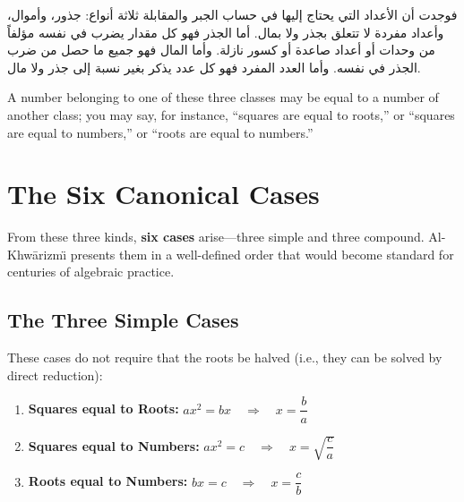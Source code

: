 \documentclass[11pt,a4paper]{book}
\begin{document}
\begin{arabicbox}
\begin{Arabic}
فوجدت أن الأعداد التي يحتاج إليها في حساب الجبر والمقابلة
ثلاثة أنواع: جذور، وأموال، وأعداد مفردة لا تتعلق بجذر ولا
بمال. أما الجذر فهو كل مقدار يضرب في نفسه مؤلفاً من
وحدات أو أعداد صاعدة أو كسور نازلة. وأما المال فهو جميع ما
حصل من ضرب الجذر في نفسه. وأما العدد المفرد فهو كل عدد
يذكر بغير نسبة إلى جذر ولا مال.
\end{Arabic}
\end{arabicbox}

A number belonging to one of these three classes may be equal to a number of
another class; you may say, for instance, ``squares are equal to roots,'' or
``squares are equal to numbers,'' or ``roots are equal to numbers.''

\newpage

\section{The Six Canonical Cases}
\label{sec:six-cases}

From these three kinds, \textbf{six cases} arise---three simple and three
compound. Al-Khw\=arizm\"{\i} presents them in a well-defined order that would
become standard for centuries of algebraic practice.

\subsection{The Three Simple Cases}

These cases do not require that the roots be halved (i.e., they can be solved
by direct reduction):

\begin{mathbox}[title={\textbf{Simple Cases (do not require halving)}}]
\begin{enumerate}[label=\textbf{Case \Roman*:},leftmargin=3em]
  \item \textbf{Squares equal to Roots:}
  $ax^2 = bx \quad\Longrightarrow\quad x = \dfrac{b}{a}$
  
  \item \textbf{Squares equal to Numbers:}
  $ax^2 = c \quad\Longrightarrow\quad x = \sqrt{\dfrac{c}{a}}$
  
  \item \textbf{Roots equal to Numbers:}
  $bx = c \quad\Longrightarrow\quad x = \dfrac{c}{b}$
\end{enumerate}
\end{mathbox}
\end{document}
